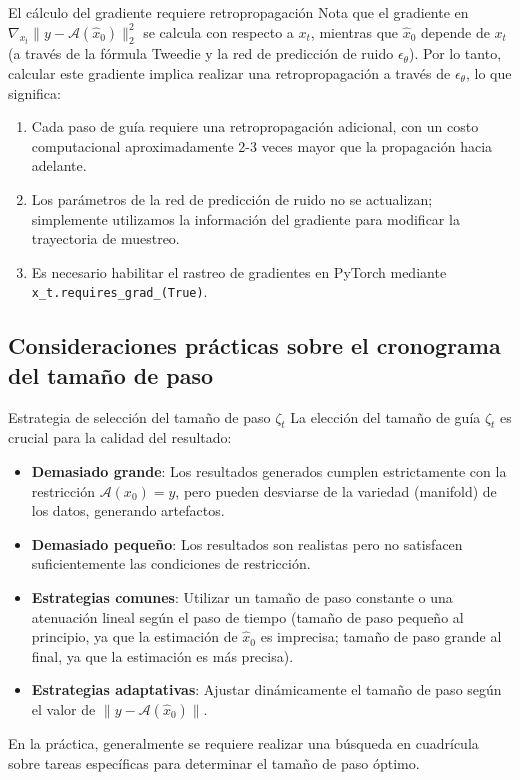 \begin{warningbox}{El cálculo del gradiente requiere retropropagación}
Nota que el gradiente en $\nabla_{x_t} \| y - \mathcal{A}(\hat{x}_0) \|_2^2$ se calcula con respecto a $x_t$, mientras que $\hat{x}_0$ depende de $x_t$ (a través de la fórmula Tweedie y la red de predicción de ruido $\epsilon_\theta$). Por lo tanto, calcular este gradiente implica realizar una retropropagación a través de $\epsilon_\theta$, lo que significa:
\begin{enumerate}
    \item Cada paso de guía requiere una retropropagación adicional, con un costo computacional aproximadamente 2-3 veces mayor que la propagación hacia adelante.
    \item Los parámetros de la red de predicción de ruido no se actualizan; simplemente utilizamos la información del gradiente para modificar la trayectoria de muestreo.
    \item Es necesario habilitar el rastreo de gradientes en PyTorch mediante \texttt{x\_t.requires\_grad\_(True)}.
\end{enumerate}
\end{warningbox}

\subsection{Consideraciones prácticas sobre el cronograma del tamaño de paso}

\begin{knowledgebox}{Estrategia de selección del tamaño de paso $\zeta_t$}
La elección del tamaño de guía $\zeta_t$ es crucial para la calidad del resultado:
\begin{itemize}
    \item \textbf{Demasiado grande}: Los resultados generados cumplen estrictamente con la restricción $\mathcal{A}(x_0) = y$, pero pueden desviarse de la variedad (manifold) de los datos, generando artefactos.
    \item \textbf{Demasiado pequeño}: Los resultados son realistas pero no satisfacen suficientemente las condiciones de restricción.
    \item \textbf{Estrategias comunes}: Utilizar un tamaño de paso constante o una atenuación lineal según el paso de tiempo (tamaño de paso pequeño al principio, ya que la estimación de $\hat{x}_0$ es imprecisa; tamaño de paso grande al final, ya que la estimación es más precisa).
    \item \textbf{Estrategias adaptativas}: Ajustar dinámicamente el tamaño de paso según el valor de $\| y - \mathcal{A}(\hat{x}_0) \|$.
\end{itemize}
En la práctica, generalmente se requiere realizar una búsqueda en cuadrícula sobre tareas específicas para determinar el tamaño de paso óptimo.
\end{knowledgebox}

